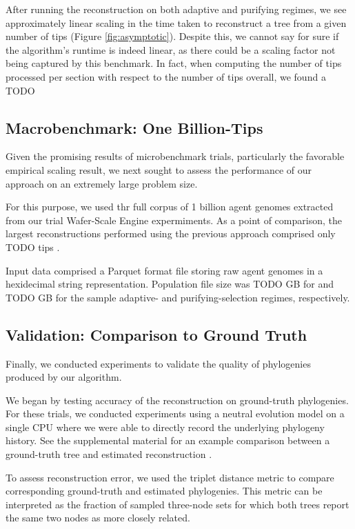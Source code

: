 After running the reconstruction on both adaptive and purifying regimes, we see approximately linear scaling in the time taken to reconstruct a tree from a given number of tips (Figure \ref{fig:asymptotic}).
Despite this, we cannot say for sure if the algorithm's runtime is indeed linear, as there could be a scaling factor not being captured by this benchmark.
In fact, when computing the number of tips processed per section with respect to the number of tips overall, we found a TODO 

\subsection{Macrobenchmark: One Billion-Tips}



Given the promising results of microbenchmark trials, particularly the favorable empirical scaling result, we next sought to assess the performance of our approach on an extremely large problem size.

For this purpose, we used thr full corpus of 1 billion agent genomes extracted from our trial Wafer-Scale Engine expermiments.
As a point of comparison, the largest reconstructions performed using the previous approach comprised only TODO tips \citep{moreno2024towards}.

Input data comprised a Parquet format file storing raw agent genomes in a hexidecimal string representation.
Population file size was TODO GB for and TODO GB for the sample adaptive- and purifying-selection regimes, respectively.

\subsection{Validation: Comparison to Ground Truth}

Finally, we conducted experiments to validate the quality of phylogenies produced by our algorithm.

We began by testing accuracy of the reconstruction on ground-truth phylogenies.
For these trials, we conducted experiments using a neutral evolution model on a single CPU where we were able to directly record the underlying phylogeny history. See the supplemental material for an example comparison between a ground-truth tree and estimated reconstruction \citep{supplemental}.

To assess reconstruction error, we used the triplet distance metric to compare corresponding ground-truth and estimated phylogenies.
This metric can be interpreted as the fraction of sampled three-node sets for which both trees report the same two nodes as more closely related.

